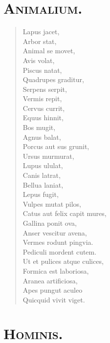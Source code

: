 \documentclass[12pt,  postvopaper]{memoir}
\begin{document}
\section*{\textsc{Animalium.}}

\begin{verse}

  Lapus jacet,\\
  Arbor stat,\\
  Animal se movet,\\
  Avis volat,\\
  Piscus natat,\\
  Quadrupes graditur,\\
  Serpens serpit,\\
  Vermis repit,\\
  Cervus currit,\\
  Equus hinnit,\\
  Bos mugit,\\
  Agnus balat,\\
  Porcus aut sus grunit,\\
  Ursus murmurat,\\
  Lupus ululat,\\
  Canis latrat,\\
  Bellua laniat,\\
  Lepus fugit,\\
  Vulpes mutat pilos,\\
  Catus aut felix capit mures,\\
  Gallina ponit ova,\\
  Anser vescitur avena,\\
  Vermes rodunt pingvia.\\
  Pediculi mordent cutem.\\
  Ut et pulices atque culices,\\
  Formica est laboriosa,\\
  Aranea artificiosa,\\
  Apes pungut aculeo \\
  Quicquid vivit viget.\\
\end{verse}
\section*{\textsc{Hominis.}}
\end{document}
